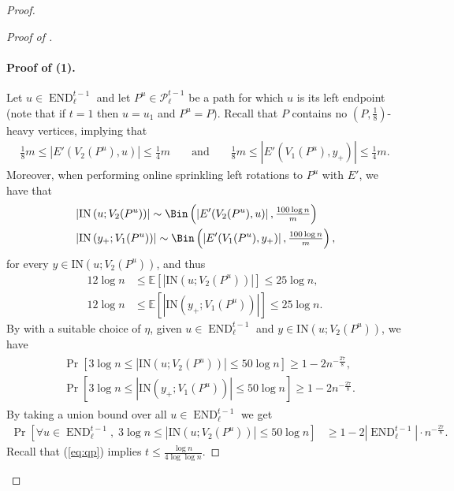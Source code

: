 \documentclass{article}
\DeclareMathOperator{\END}{END}
\newcommand{\IN}[2]{\text{IN}\left(#1; #2 \right)}
\begin{document}
\begin{proof}
\begin{proof}[Proof of ]
		\paragraph*{Proof of (1).}
		Let $u \in \END_{\ell}^{t-1}$ and let $P^u \in \mathcal P_{\ell}^{t-1}$ be a path for which $u$ is its left endpoint (note that if $t=1$ then $u=u_1$ and $P^u=P$).
		Recall that $P$ contains no $\left(P, \frac{1}{8} \right)$-heavy vertices, implying that
		\begin{align*}
		\tfrac{1}{8}m \le \left|E'\left(V_2(P^u), u \right) \right| \le \tfrac{1}{4}m && \text{ and } && \tfrac{1}{8}m \le \left|E'\left(V_1(P^u), y_+ \right) \right| \le \tfrac{1}{4}m.
		\end{align*}
		Moreover, when performing online sprinkling left rotations to $P^u$ with $E'$, we have that
		\begin{align*}
		&\left|\IN{u}{V_2(P^u)} \right| \sim \Bin\left(\left|E'(V_2(P^u), u) \right|, \tfrac{100\log n}{m} \right) \\
		&\left|\IN{y_+}{V_1(P^u)} \right| \sim \Bin\left(\left|E'(V_1(P^u), y_+) \right|, \tfrac{100\log n}{m} \right),    
		\end{align*}
		for every $y \in \IN{u}{V_2(P^u)}$, and thus
		\begin{align*}
		12 \log n &\le \mathbb E \left[\left|\IN{u}{V_2(P^u)} \right| \right] \le 25 \log n, \\
		12 \log n &\le \mathbb E \left[\left|\IN{y_+}{V_1(P^u)} \right| \right] \le 25 \log n.
		\end{align*}
		By  with a suitable choice of $\eta$, given $u \in \END_{\ell}^{t-1}$ and $y \in \IN{u}{V_2(P^u)}$, we have
		\begin{align}
		\begin{split}
		\label{eq:Pexpsize}
		&\Pr\left[3\log n \le \left|\IN{u}{V_2(P^u)} \right| \le 50\log n \right] \ge 1 - 2n^{-\frac{27}{8}}, \\
		&\Pr\left[3\log n \le \left|\IN{y_+}{V_1(P^u)} \right| \le 50\log n \right] \ge 1 - 2n^{-\frac{27}{8}}.
		\end{split}
		\end{align}
		By taking a union bound over all $u \in \END_{\ell}^{t-1}$ we get
		\begin{align*}
		\Pr\left[\forall u \in \END_{\ell}^{t-1},\; 3\log n \le \left|\IN{u}{V_2(P^u)} \right| \le 50 \log n \right] &\ge 1 - 2\left|\END_{\ell}^{t-1} \right| \cdot n^{-\frac{27}{8}}.
		\end{align*}
		Recall that (\ref{eq:qp}) implies $t \le \frac{\log n}{4\log\log n}$.

\end{proof}
\end{proof}
\end{document}
